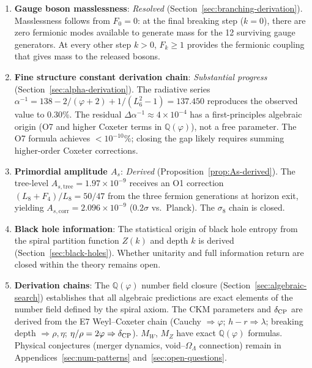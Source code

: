 \documentclass[12pt,a4paper]{article}
\begin{document}
\begin{enumerate}
\item \textbf{Gauge boson masslessness}: \emph{Resolved} (Section~\ref{sec:branching-derivation}). Masslessness follows from $F_0 = 0$: at the final breaking step ($k = 0$), there are zero fermionic modes available to generate mass for the 12 surviving gauge generators. At every other step $k > 0$, $F_k \geq 1$ provides the fermionic coupling that gives mass to the released bosons.

\item \textbf{Fine structure constant derivation chain}: \emph{Substantial progress} (Section~\ref{sec:alpha-derivation}). The radiative series $\alpha^{-1} = 138 - 2/(\varphi + 2) + 1/(L_6^2 - 1) = 137.450$ reproduces the observed value to 0.30\%. The residual $\Delta\alpha^{-1} \approx 4 \times 10^{-4}$ has a first-principles algebraic origin (O7 and higher Coxeter terms in $\mathbb{Q}(\varphi)$), not a free parameter. The O7 formula achieves $< 10^{-10}\%$; closing the gap likely requires summing higher-order Coxeter corrections.

\item \textbf{Primordial amplitude $A_s$}: \emph{Derived} (Proposition~\ref{prop:As-derived}). The tree-level $A_{s,\mathrm{tree}} = 1.97 \times 10^{-9}$ receives an O1 correction $(L_8 + F_4)/L_8 = 50/47$ from the three fermion generations at horizon exit, yielding $A_{s,\mathrm{corr}} = 2.096 \times 10^{-9}$ ($0.2\sigma$ vs.\ Planck). The $\sigma_8$ chain is closed.

\item \textbf{Black hole information}: The statistical origin of black hole entropy from the spiral partition function $Z(k)$ and depth $k$ is derived (Section~\ref{sec:black-holes}). Whether unitarity and full information return are closed within the theory remains open.

\item \textbf{Derivation chains}: The $\mathbb{Q}(\varphi)$ number field closure (Section~\ref{sec:algebraic-search}) establishes that all algebraic predictions are exact elements of the number field defined by the spiral axiom. The CKM parameters and $\delta_{\rm CP}$ are derived from the E7 Weyl--Coxeter chain (Cauchy $\Rightarrow \varphi$; $h{-}r \Rightarrow \lambda$; breaking depth $\Rightarrow \rho, \eta$; $\eta/\rho = 2\varphi \Rightarrow \delta_{\rm CP}$). $M_W$, $M_Z$ have exact $\mathbb{Q}(\varphi)$ formulas. Physical conjectures (merger dynamics, void--$\Omega_\Lambda$ connection) remain in Appendices~\ref{sec:num-patterns} and~\ref{sec:open-questions}.
\end{enumerate}
\end{document}

